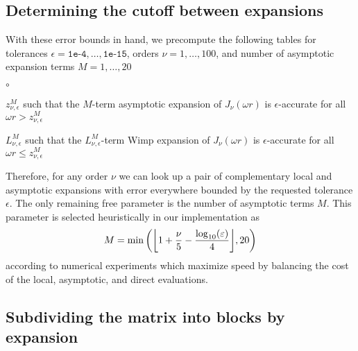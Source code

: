 

\subsection{Determining the cutoff between expansions}

With these error bounds in hand, we precompute the following tables for
tolerances $\epsilon = \texttt{1e-4}, \dots, \texttt{1e-15}$, orders $\nu = 1,
\dots, 100$, and number of asymptotic expansion terms $M = 1, \dots, 20$
\begin{list}{$\circ$}{}
    \item $z_{\nu, \epsilon}^M$ such that the $M$-term asymptotic expansion of
    $J_\nu(\omega r)$ is $\epsilon$-accurate for all $\omega r > z_{\nu,
    \epsilon}^M$
    \item $L_{\nu, \epsilon}^M$ such that the $L_{\nu, \epsilon}^M$-term Wimp
    expansion of $J_\nu(\omega r)$ is $\epsilon$-accurate for all $\omega r \leq
    z_{\nu, \epsilon}^M$
\end{list}
Therefore, for any order $\nu$ we can look up a pair of complementary local and
asymptotic expansions with error everywhere bounded by the requested tolerance
$\epsilon$. The only remaining free parameter is the number of asymptotic terms
$M$. This parameter is selected heuristically in our implementation as 
\begin{align} \label{eq:num-asy-terms}
    M = \min\left(\flr{1 + \frac{\nu}{5} - \frac{\log_{10}(\epsilon)}{4}}, 20\right)
\end{align}
according to numerical experiments which maximize speed by balancing the cost of
the local, asymptotic, and direct evaluations.

\subsection{Subdividing the matrix into blocks by expansion}

